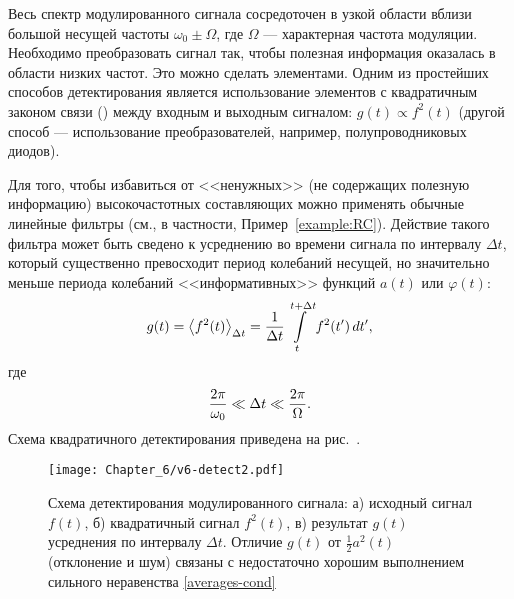 Весь спектр модулированного сигнала сосредоточен в узкой области
вблизи большой несущей частоты $\omega_0\pm \Omega$, где $\Omega$ ---
характерная частота модуляции. Необходимо преобразовать сигнал так,
чтобы полезная информация оказалась в области низких частот. Это можно
сделать  элементами. Одним из простейших способов
детектирования является использование элементов с квадратичным законом связи
() между входным и выходным сигналом:
$g(t)\propto f^2(t)$ (другой способ --- использование 
преобразователей, например, полупроводниковых диодов).

Для того, чтобы избавиться от <<ненужных>> (не содержащих полезную
информацию) высокочастотных составляющих можно применять обычные линейные
фильтры (см., в частности, Пример~\ref{example:RC}). Действие такого фильтра может быть сведено к усреднению во времени
сигнала по интервалу $\Delta t$, который существенно превосходит период
колебаний несущей, но значительно меньше периода колебаний <<информативных>>
функций $a(t)$ или $\varphi(t)$:
\begin{equation}
    \eqmark{averages-sq}
g(t) = \left<f^2(t)\right>_{\Delta t} = \frac{1}{\Delta t}
\int\limits_{t}^{t+\Delta t} f^2(t')\,dt',
\end{equation}
где
\begin{equation}
    \eqmark{averages-cond}
    \frac{2\pi}{\omega_0} \ll \Delta t \ll \frac{2\pi}{\Omega}.
\end{equation}
Схема квадратичного детектирования приведена на рис.~.
\begin{figure}[h]
 \texttt{[image: Chapter\_6/v6-detect2.pdf]}
 \caption{Схема детектирования модулированного сигнала:
     а) исходный сигнал $f(t)$, б) квадратичный сигнал
 $f^2(t)$, в) результат $g(t)$ усреднения по интервалу $\Delta t$.
Отличие $g(t)$ от $\frac12a^2(t)$ (отклонение и шум)
связаны с недостаточно хорошим выполнением сильного неравенства
\eqref{averages-cond}}
\end{figure}

